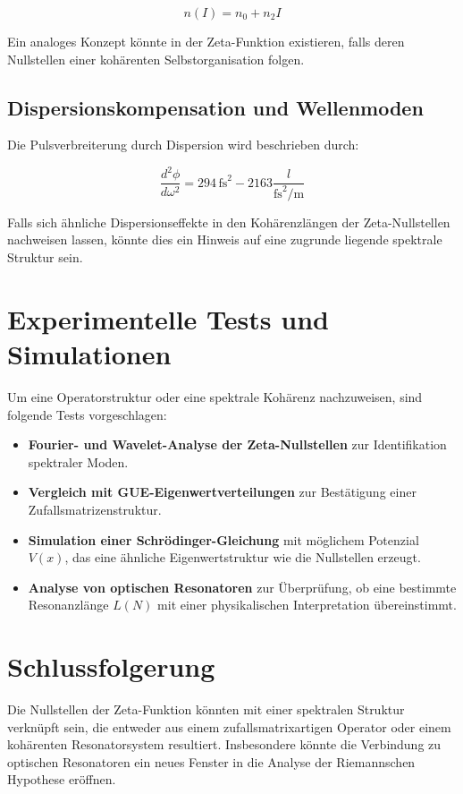 \documentclass[a4paper,12pt]{article}
\begin{document}
\begin{equation}
n(I) = n_0 + n_2 I
\end{equation}

Ein analoges Konzept könnte in der Zeta-Funktion existieren, falls deren Nullstellen einer kohärenten Selbstorganisation folgen.

\subsection{Dispersionskompensation und Wellenmoden}
Die Pulsverbreiterung durch Dispersion wird beschrieben durch:

\begin{equation}
\frac{d^2\phi}{d\omega^2} = 294\,\text{fs}^2 - 2163\frac{l}{\text{fs}^2/\text{m}}
\end{equation}

Falls sich ähnliche Dispersionseffekte in den Kohärenzlängen der Zeta-Nullstellen nachweisen lassen, könnte dies ein Hinweis auf eine zugrunde liegende spektrale Struktur sein.

\section{Experimentelle Tests und Simulationen}
Um eine Operatorstruktur oder eine spektrale Kohärenz nachzuweisen, sind folgende Tests vorgeschlagen:
\begin{itemize}
    \item \textbf{Fourier- und Wavelet-Analyse der Zeta-Nullstellen} zur Identifikation spektraler Moden.
    \item \textbf{Vergleich mit GUE-Eigenwertverteilungen} zur Bestätigung einer Zufallsmatrizenstruktur.
    \item \textbf{Simulation einer Schrödinger-Gleichung} mit möglichem Potenzial \(V(x)\), das eine ähnliche Eigenwertstruktur wie die Nullstellen erzeugt.
    \item \textbf{Analyse von optischen Resonatoren} zur Überprüfung, ob eine bestimmte Resonanzlänge \(L(N)\) mit einer physikalischen Interpretation übereinstimmt.
\end{itemize}

\section{Schlussfolgerung}
Die Nullstellen der Zeta-Funktion könnten mit einer spektralen Struktur verknüpft sein, die entweder aus einem zufallsmatrixartigen Operator oder einem kohärenten Resonatorsystem resultiert. Insbesondere könnte die Verbindung zu optischen Resonatoren ein neues Fenster in die Analyse der Riemannschen Hypothese eröffnen.
\end{document}
